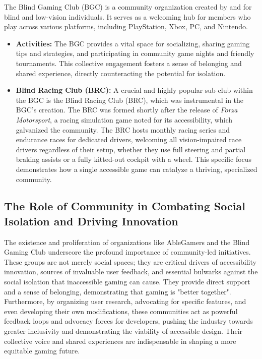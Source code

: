 The Blind Gaming Club (BGC) is a community organization created by and for blind and low-vision individuals\supercite{BlindGamingClub}. It serves as a welcoming hub for members who play across various platforms, including PlayStation, Xbox, PC, and Nintendo\supercite{BlindGamingClub}.
\begin{itemize}
    \item \textbf{Activities:} The BGC provides a vital space for socializing, sharing gaming tips and strategies, and participating in community game nights and friendly tournaments\supercite{BlindGamingClub}. This collective engagement fosters a sense of belonging and shared experience, directly counteracting the potential for isolation.
    \item \textbf{Blind Racing Club (BRC):} A crucial and highly popular sub-club within the BGC is the Blind Racing Club (BRC), which was instrumental in the BGC's creation\supercite{BlindGamingClub}. The BRC was formed shortly after the release of \textit{Forza Motorsport}, a racing simulation game noted for its accessibility, which galvanized the community\supercite{BlindGamingClub}. The BRC hosts monthly racing series and endurance races for dedicated drivers, welcoming all vision-impaired race drivers regardless of their setup, whether they use full steering and partial braking assists or a fully kitted-out cockpit with a wheel\supercite{BlindGamingClub}. This specific focus demonstrates how a single accessible game can catalyze a thriving, specialized community.
\end{itemize}

\subsection{The Role of Community in Combating Social Isolation and Driving Innovation}

The existence and proliferation of organizations like AbleGamers and the Blind Gaming Club underscore the profound importance of community-led initiatives. These groups are not merely social spaces; they are critical drivers of accessibility innovation, sources of invaluable user feedback, and essential bulwarks against the social isolation that inaccessible gaming can cause. They provide direct support and a sense of belonging, demonstrating that gaming is "better together"\supercite{BlindGamingClub}. Furthermore, by organizing user research, advocating for specific features, and even developing their own modifications, these communities act as powerful feedback loops and advocacy forces for developers, pushing the industry towards greater inclusivity and demonstrating the viability of accessible design. Their collective voice and shared experiences are indispensable in shaping a more equitable gaming future.


